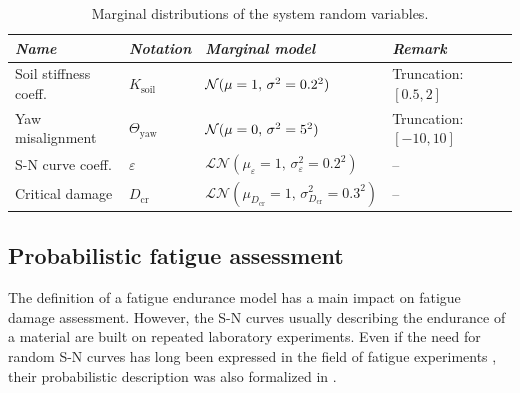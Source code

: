\begin{table}[h!]
    \centering
    \caption{Marginal distributions of the system random variables.}
    \begin{tabular}{llll}
        \hline
        {\it Name} & {\it Notation} & {\it Marginal model} & {\it Remark}\\
        \hline
        Soil stiffness coeff. & $K_{\mathrm{soil}}$ & $\mathcal{N}(\mu=1, \, \sigma^2=0.2^2)$ & Truncation: $[0.5, 2]$\\
        Yaw misalignment & $\Theta_{\mathrm{yaw}}$ & $\mathcal{N}(\mu=0, \, \sigma^2=5^2)$ & Truncation: $[-10, 10]$\\
        S-N curve coeff. & $\varepsilon$ & $\mathcal{LN}(\mu_\varepsilon=1, \, \sigma^2_\varepsilon=0.2^2)$ & --\\
        Critical damage & $D_{\mathrm{cr}}$ & $\mathcal{LN}(\mu_{D_{\mathrm{cr}}}=1, \, \sigma^2_{D_{\mathrm{cr}}}=0.3^2)$ & --\\\hline
    \end{tabular}
    \label{tab:sys_variables}
\end{table}



\subsection{Probabilistic fatigue assessment}\label{sec:probabilistic_sn}
The definition of a fatigue endurance model has a main impact on fatigue damage assessment. 
However, the S-N curves usually describing the endurance of a material are built on repeated laboratory experiments. 
Even if the need for random S-N curves has long been expressed in the field of fatigue experiments \citep{lieurade_1982_essais_fatigue}, their probabilistic description was also formalized in \citep{guede_2007,sudret_2013_fatigue}. 

